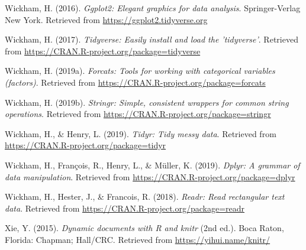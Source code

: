 \documentclass[man]{apa6}
\begin{document}
\hypertarget{ref-R-ggplot2}{}
Wickham, H. (2016). \emph{Ggplot2: Elegant graphics for data analysis}.
Springer-Verlag New York. Retrieved from
\url{https://ggplot2.tidyverse.org}

\hypertarget{ref-R-tidyverse}{}
Wickham, H. (2017). \emph{Tidyverse: Easily install and load the
'tidyverse'}. Retrieved from
\url{https://CRAN.R-project.org/package=tidyverse}

\hypertarget{ref-R-forcats}{}
Wickham, H. (2019a). \emph{Forcats: Tools for working with categorical
variables (factors)}. Retrieved from
\url{https://CRAN.R-project.org/package=forcats}

\hypertarget{ref-R-stringr}{}
Wickham, H. (2019b). \emph{Stringr: Simple, consistent wrappers for
common string operations}. Retrieved from
\url{https://CRAN.R-project.org/package=stringr}

\hypertarget{ref-R-tidyr}{}
Wickham, H., \& Henry, L. (2019). \emph{Tidyr: Tidy messy data}.
Retrieved from \url{https://CRAN.R-project.org/package=tidyr}

\hypertarget{ref-R-dplyr}{}
Wickham, H., François, R., Henry, L., \& Müller, K. (2019). \emph{Dplyr:
A grammar of data manipulation}. Retrieved from
\url{https://CRAN.R-project.org/package=dplyr}

\hypertarget{ref-R-readr}{}
Wickham, H., Hester, J., \& Francois, R. (2018). \emph{Readr: Read
rectangular text data}. Retrieved from
\url{https://CRAN.R-project.org/package=readr}

\hypertarget{ref-R-knitr}{}
Xie, Y. (2015). \emph{Dynamic documents with R and knitr} (2nd ed.).
Boca Raton, Florida: Chapman; Hall/CRC. Retrieved from
\url{https://yihui.name/knitr/}
\end{document}
